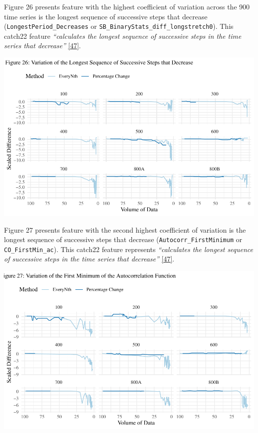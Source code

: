 \documentclass{article}
\begin{document}
\vspace{-0.4cm}

Figure 26 presents feature with the highest coefficient of variation
across the 900 time series is the longest sequence of successive steps
that decrease (\texttt{LongestPeriod\_Decreases} or
\texttt{SB\_BinaryStats\_diff\_longstretch0}). This catch22 feature
\emph{``calculates the longest sequence of successive steps in the time
series that decrease''} \protect\hyperlink{ref-feature_book}{{[}47{]}}.

\includegraphics{210431461_CSC8639_Dissertation_files/figure-latex/LongestDecrease-1.pdf}

Figure 27 presents feature with the second highest coefficient of
variation is the longest sequence of successive steps that decrease
(\texttt{Autocorr\_FirstMinimum} or \texttt{CO\_FirstMin\_ac}). This
catch22 feature represents \emph{``calculates the longest sequence of
successive steps in the time series that decrease''}
\protect\hyperlink{ref-feature_book}{{[}47{]}}.

\includegraphics{210431461_CSC8639_Dissertation_files/figure-latex/FirstMinimum2-1.pdf}
\end{document}
